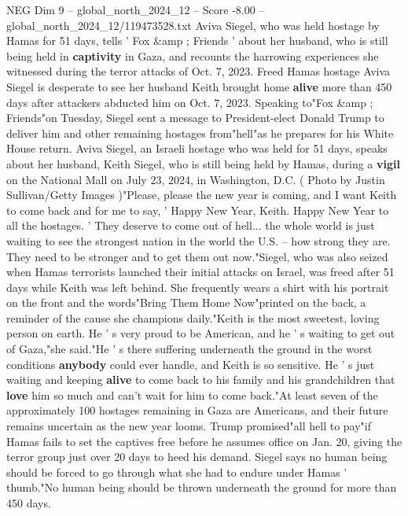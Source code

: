 \begin{textsample}{NEG Dim 9 – global\_north\_2024\_12 – Score -8.00 – global\_north\_2024\_12/119473528.txt}  \label{ex:f9_neg_117}
Aviva Siegel, who was held hostage by Hamas for 51 days, tells ' Fox \&amp ; Friends ' about her husband, who is still being held in \textbf{captivity} in Gaza, and recounts the harrowing experiences she witnessed during the terror attacks of Oct. 7, 2023.
Freed Hamas hostage Aviva Siegel is desperate to see her husband Keith brought home \textbf{alive} more than 450 days after attackers abducted him on Oct. 7, 2023.
Speaking to"Fox \&amp ; Friends"on Tuesday, Siegel sent a message to President-elect Donald Trump to deliver him and other remaining hostages from"hell"as he prepares for his White House return.
Aviva Siegel, an Israeli hostage who was held for 51 days, speaks about her husband, Keith Siegel, who is still being held by Hamas, during a \textbf{vigil} on the National Mall on July 23, 2024, in Washington, D.C. ( Photo by Justin Sullivan/Getty Images )"Please, please the new year is coming, and I want Keith to come back and for me to say, ' Happy New Year, Keith.
Happy New Year to all the hostages. ' They deserve to come out of hell... the whole world is just waiting to see the strongest nation in the world the U.S. -- how strong they are.
They need to be stronger and to get them out now."Siegel, who was also seized when Hamas terrorists launched their initial attacks on Israel, was freed after 51 days while Keith was left behind.
She frequently wears a shirt with his portrait on the front and the words"Bring Them Home Now"printed on the back, a reminder of the cause she champions daily."Keith is the most sweetest, loving person on earth.
He ' s very proud to be American, and he ' s waiting to get out of Gaza,"she said."He ' s there suffering underneath the ground in the worst conditions \textbf{anybody} could ever handle, and Keith is so sensitive.
He ' s just waiting and keeping \textbf{alive} to come back to his family and his grandchildren that \textbf{love} him so much and can't wait for him to come back."At least seven of the approximately 100 hostages remaining in Gaza are Americans, and their future remains uncertain as the new year looms.
Trump promised"all hell to pay"if Hamas fails to set the captives free before he assumes office on Jan. 20, giving the terror group just over 20 days to heed his demand.
Siegel says no human being should be forced to go through what she had to endure under Hamas ' thumb."No human being should be thrown underneath the ground for more than 450 days.

\end{textsample}
